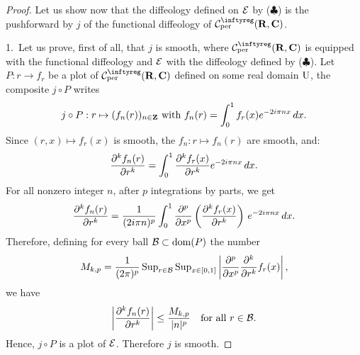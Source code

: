 \begin{proof}
  Let us show now that the diffeology defined on $\mathcal{E}$ by ($\clubsuit$) is the pushforward by $j$
  of the functional diffeology of $\Cinfty_{\rm per}(\RR,\CC)$.
  
  {1.}~Let us prove, first of all, that $j$ is smooth, where $\Cinfty_{\rm per}(\RR,\CC)$ is
  equipped with the functional diffeology and $\mathcal{E}$ with the diffeology defined by ($\clubsuit$).
  Let $P : r \to f_r$ be a plot of $\Cinfty_{\rm per}(\RR,\CC)$ defined on some real domain $\mathrm{U}$,
  the composite $j \circ P$ writes
  $$
    j\circ P : r \mapsto (f_n(r))_{n\in\mathbf{Z}} \ \text{with}\  f_n(r) = \int_0^1 f_r(x) e^{-2i\pi n x}\, dx.
    $$
  Since $(r,x) \mapsto f_r(x)$ is smooth,
  the $f_n : r \mapsto f_n(r)$ are smooth,
  and:
  $$
    {\partial^k f_n(r) \over \partial r^k} = \int_0^1 {\partial^k f_r(x) \over \partial r^k} e^{-2i\pi n x}\,dx.
    $$
  For all nonzero integer $n$,
  after $p$ integrations by parts,
  we get
  $$
    {\partial^k f_n(r) \over \partial r^k} =  {1 \over (2i\pi n)^{p}} \int_0^1 {\partial^{p} \over \partial x^{p}}
    \left( {\partial^k f_r(x) \over \partial r^k}\right)\, e^{-2i\pi n x}\,dx.
    $$
  Therefore,
  defining for every ball $\mathcal{B}\subset\mathrm{dom}(P)$ the number
  $$
    M_{k,p} = {1 \over (2\pi)^p} \operatorname{Sup}_{r \in \mathcal{B}} \operatorname{Sup}_{x \in [0,1]}
    \left| {\partial^{p} \over \partial x^{p}} {\partial^k  \over \partial r^k}f_r(x) \right|,
    $$
  we have
  $$
    \left| {\partial^k f_n(r) \over \partial r^k} \right| \leq {M_{k,p} \over \vert n \vert^p}\quad \mbox{for all $r\in \mathcal{B}$.}
    $$
  Hence, $j \circ P$ is a plot of $\mathcal{E}$. Therefore $j$ is smooth.
  

\end{proof}
